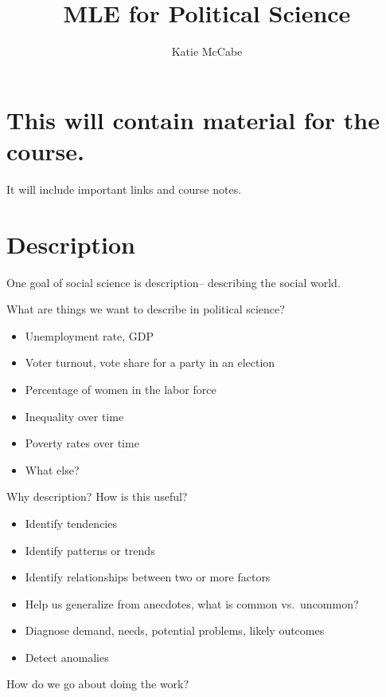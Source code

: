 \documentclass[]{book}
\title{MLE for Political Science}
\author{Katie McCabe}
\date{}
\providecommand{\tightlist}{%
  \setlength{\itemsep}{0pt}\setlength{\parskip}{0pt}}
\begin{document}
\maketitle

{
\setcounter{tocdepth}{1}
\tableofcontents
}
\hypertarget{this-will-contain-material-for-the-course.}{%
\chapter{This will contain material for the course.}\label{this-will-contain-material-for-the-course.}}

It will include important links and course notes.

\hypertarget{descrip}{%
\chapter{Description}\label{descrip}}

One goal of social science is description-- describing the social world.

What are things we want to describe in political science?

\begin{itemize}
\tightlist
\item
  Unemployment rate, GDP
\item
  Voter turnout, vote share for a party in an election
\item
  Percentage of women in the labor force
\item
  Inequality over time
\item
  Poverty rates over time
\item
  What else?
\end{itemize}

Why description? How is this useful?

\begin{itemize}
\tightlist
\item
  Identify tendencies
\item
  Identify patterns or trends
\item
  Identify relationships between two or more factors
\item
  Help us generalize from anecdotes, what is common vs.~uncommon?
\item
  Diagnose demand, needs, potential problems, likely outcomes
\item
  Detect anomalies
\end{itemize}

How do we go about doing the work?
\end{document}
